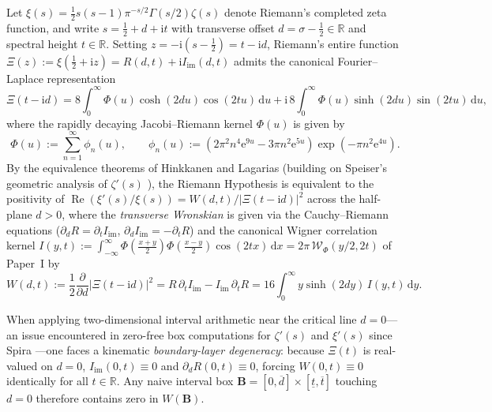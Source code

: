 \documentclass[11pt,a4paper,reqno]{amsart}
\theoremstyle{definition}
\theoremstyle{remark}
\numberwithin{equation}{section}
\newcommand{\dd}{\mathrm{d}}
\newcommand{\ii}{\mathrm{i}}
\newcommand{\ee}{\mathrm{e}}
\newcommand{\Rea}{\operatorname{Re}}
\newcommand{\Wig}{\mathcal{W}}
\begin{document}
Let $\xi(s) = \frac{1}{2}s(s-1)\pi^{-s/2}\Gamma(s/2)\zeta(s)$ denote Riemann's completed zeta function, and write $s = \frac{1}{2} + d + \ii t$ with transverse offset $d = \sigma - \frac{1}{2} \in \mathbb{R}$ and spectral height $t \in \mathbb{R}$. Setting $z = -\ii(s - \frac{1}{2}) = t - \ii d$, Riemann's entire function $\Xi(z) := \xi(\frac{1}{2} + \ii z) = R(d,t) + \ii I_{\mathrm{im}}(d,t)$ admits the canonical Fourier--Laplace representation \cite{Riemann1859,Polya1926,Titchmarsh1986}
\begin{equation}\label{eq:Xi_integral}
\Xi(t - \ii d) = 8\int_0^\infty \Phi(u)\cosh(2d u)\cos(2t u)\,\dd u + \ii\,8\int_0^\infty \Phi(u)\sinh(2d u)\sin(2t u)\,\dd u,
\end{equation}
where the rapidly decaying Jacobi--Riemann kernel $\Phi(u)$ is given by
\begin{equation}\label{eq:Phi_def}
\Phi(u) := \sum_{n=1}^\infty \phi_n(u), \qquad \phi_n(u) := \left(2\pi^2 n^4 \ee^{9u} - 3\pi n^2 \ee^{5u}\right)\exp\!\left(-\pi n^2 \ee^{4u}\right).
\end{equation}
By the equivalence theorems of Hinkkanen \cite{Hinkkanen1997} and Lagarias \cite{Lagarias1999} (building on Speiser's geometric analysis of $\zeta'(s)$ \cite{Speiser1934}), the Riemann Hypothesis is equivalent to the positivity of $\Rea(\xi'(s)/\xi(s)) = W(d,t)/|\Xi(t-\ii d)|^2$ across the half-plane $d > 0$, where the \emph{transverse Wronskian} is given via the Cauchy--Riemann equations ($\partial_d R = \partial_t I_{\mathrm{im}}$, $\partial_d I_{\mathrm{im}} = -\partial_t R$) and the canonical Wigner correlation kernel $I(y,t) := \int_{-\infty}^\infty \Phi(\frac{x+y}{2})\Phi(\frac{x-y}{2})\cos(2t x)\,\dd x = 2\pi\,\Wig_\Phi(y/2, 2t)$ of Paper~I \cite{Missiaen2026Paper1} by
\begin{equation}\label{eq:W_def}
W(d,t) := \frac{1}{2}\frac{\partial}{\partial d}\big|\Xi(t-\ii d)\big|^2 = R\,\partial_t I_{\mathrm{im}} - I_{\mathrm{im}}\,\partial_t R = 16\int_0^\infty y\sinh(2d y)\,I(y,t)\,\dd y.
\end{equation}

When applying two-dimensional interval arithmetic near the critical line $d = 0$---an issue encountered in zero-free box computations for $\zeta'(s)$ and $\xi'(s)$ since Spira \cite{Spira1968,Spira1973}---one faces a kinematic \emph{boundary-layer degeneracy}: because $\Xi(t)$ is real-valued on $d = 0$, $I_{\mathrm{im}}(0,t) \equiv 0$ and $\partial_d R(0,t) \equiv 0$, forcing $W(0,t) \equiv 0$ identically for all $t \in \mathbb{R}$. Any naive interval box $\mathbf{B} = [0, \overline{d}] \times [\underline{t}, \overline{t}]$ touching $d = 0$ therefore contains zero in $W(\mathbf{B})$.
\end{document}
